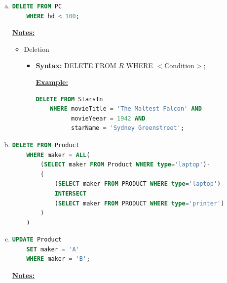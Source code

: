 \documentclass[12pt]{article}
\begin{document}
\begin{enumerate}[1.]
\begin{enumerate}[a)]
        \item

    \begin{lstlisting}[language=SQL]
    DELETE FROM PC
    WHERE hd < 100;
    \end{lstlisting}

        \bigskip

        \underline{\textbf{Notes:}}

        \bigskip

        \begin{itemize}
            \item Deletion
            \begin{itemize}
                \item \textbf{Syntax:} DELETE FROM $R$ WHERE $<\text{Condition}>$;

                \bigskip

                \underline{\textbf{Example:}}

                \bigskip

    \begin{lstlisting}[language=SQL]
    DELETE FROM StarsIn
    WHERE movieTitle = 'The Maltest Falcon' AND
          movieYeear = 1942 AND
          starName = 'Sydney Greenstreet';
    \end{lstlisting}
            \end{itemize}
        \end{itemize}

        \item

    \begin{lstlisting}[language=SQL]
    DELETE FROM Product
    WHERE maker = ALL(
        (SELECT maker FROM Product WHERE type='laptop')-
        (
            (SELECT maker FROM PRODUCT WHERE type='laptop')
            INTERSECT
            (SELECT maker FROM PRODUCT WHERE type='printer')
        )
    )
    \end{lstlisting}

        \item

    \begin{lstlisting}[language=SQL]
    UPDATE Product
    SET maker = 'A'
    WHERE maker = 'B';
    \end{lstlisting}

        \bigskip

        \underline{\textbf{Notes:}}

        \bigskip


\end{enumerate}
\end{enumerate}
\end{document}
